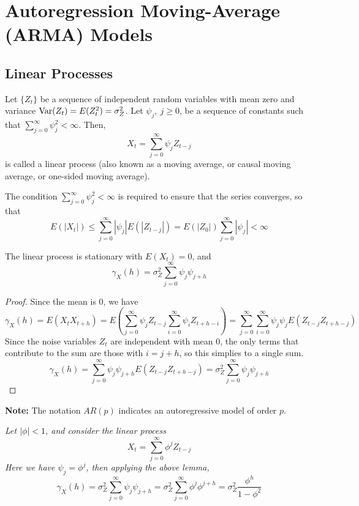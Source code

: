 
\chapter{Autoregression Moving-Average (ARMA) Models} 

\section{Linear Processes}

\begin{definition}\label{def:linear_process}
    Let $\{Z_t\}$ be a sequence of independent random variables with mean zero and variance $\operatorname{Var}(Z_t) = E(Z_t^2) = \sigma_Z^2$. Let $\psi_j, \ j \geq 0$, be a sequence of constants such that $\sum_{j=0}^\infty \psi_j^2 < \infty$. Then, 
    \[X_t = \sum_{j=0}^\infty \psi_jZ_{t-j}\]
    is called a linear process (also known as a moving average, or causal moving average, or one-sided moving average).
\end{definition}
\noindent
The condition $\sum_{j=0}^\infty \psi_j^2 < \infty$ is required to ensure that the series converges, so that
\[E(|X_t|) \leq \sum_{j=0}^\infty |\psi_j| E(|Z_{t-j}|) = E(|Z_0|) \sum_{j=0}^{\infty}|\psi_j| < \infty\]

\begin{lemma}\label{lemma:linear_acf}
    The linear process is stationary with $E(X_t) = 0$, and 
    \[\gamma_X(h) = \sigma_Z^2\sum_{j=0}^\infty \psi_j\psi_{j+h}\]
\end{lemma}

\begin{proof}
    Since the mean is 0, we have 
    \[\gamma_X(h) = E(X_tX_{t+h}) = E\left(\sum_{j=0}^\infty \psi_jZ_{t-j}\sum_{i=0}^\infty \psi_iZ_{t+h-i}\right) = \sum_{j=0}^\infty\sum_{i=0}^\infty\psi_j\psi_jE(Z_{t-j}Z_{t+h-j})\]
    Since the noise variables $Z_t$ are independent with mean 0, the only terms that contribute to the sum are those with $i = j + h$, so this simplies to a single sum.
    \[\gamma_X(h) = \sum_{j=0}^\infty \psi_j\psi_{j+h}E(Z_{t-j}Z_{t+h-j}) = \sigma_Z^2\sum_{j=0}^\infty \psi_j\psi_{j+h}\]
\end{proof}

\noindent
\textbf{Note:} The notation $AR(p)$ indicates an autoregressive model of order $p$.

\begin{example}[AR(1)]\label{ex:ar1_acf}
    \emph{
        Let $|\phi| < 1$, and consider the linear process
        \[X_t = \sum_{j=0}^\infty \phi^jZ_{t-j}\]
        Here we have $\psi_j = \phi^j$, then applying the above lemma, 
        \[\gamma_X(h) = \sigma_Z^2\sum_{j=0}^\infty \psi_j\psi_{j+h} = \sigma_Z^2 \sum_{j=0}^\infty \phi^{j}\phi^{j+h} = \sigma^2_Z\frac{\phi^h}{1-\phi^2}\]
    }
\end{example}

